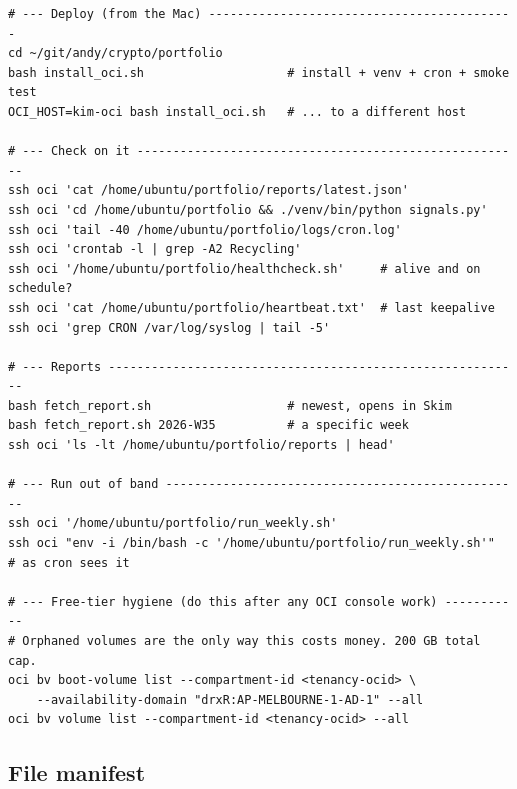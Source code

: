 \documentclass[11pt,a4paper]{article}
\begin{document}
\begin{codebox}
\begin{lstlisting}[style=shell]
# --- Deploy (from the Mac) -------------------------------------------
cd ~/git/andy/crypto/portfolio
bash install_oci.sh                    # install + venv + cron + smoke test
OCI_HOST=kim-oci bash install_oci.sh   # ... to a different host

# --- Check on it ------------------------------------------------------
ssh oci 'cat /home/ubuntu/portfolio/reports/latest.json'
ssh oci 'cd /home/ubuntu/portfolio && ./venv/bin/python signals.py'
ssh oci 'tail -40 /home/ubuntu/portfolio/logs/cron.log'
ssh oci 'crontab -l | grep -A2 Recycling'
ssh oci '/home/ubuntu/portfolio/healthcheck.sh'     # alive and on schedule?
ssh oci 'cat /home/ubuntu/portfolio/heartbeat.txt'  # last keepalive
ssh oci 'grep CRON /var/log/syslog | tail -5'

# --- Reports ----------------------------------------------------------
bash fetch_report.sh                   # newest, opens in Skim
bash fetch_report.sh 2026-W35          # a specific week
ssh oci 'ls -lt /home/ubuntu/portfolio/reports | head'

# --- Run out of band --------------------------------------------------
ssh oci '/home/ubuntu/portfolio/run_weekly.sh'
ssh oci "env -i /bin/bash -c '/home/ubuntu/portfolio/run_weekly.sh'"  # as cron sees it

# --- Free-tier hygiene (do this after any OCI console work) -----------
# Orphaned volumes are the only way this costs money. 200 GB total cap.
oci bv boot-volume list --compartment-id <tenancy-ocid> \
    --availability-domain "drxR:AP-MELBOURNE-1-AD-1" --all
oci bv volume list --compartment-id <tenancy-ocid> --all
\end{lstlisting}
\end{codebox}

\subsection*{File manifest}
\end{document}
